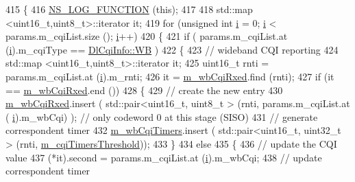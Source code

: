 \begin{DoxyCode}
415 \{
416   \hyperlink{log-macros-disabled_8h_a90b90d5bad1f39cb1b64923ea94c0761}{NS\_LOG\_FUNCTION} (\textcolor{keyword}{this});
417 
418   std::map <uint16\_t,uint8\_t>::iterator it;
419   \textcolor{keywordflow}{for} (\textcolor{keywordtype}{unsigned} \textcolor{keywordtype}{int} \hyperlink{bernuolliDistribution_8m_a6f6ccfcf58b31cb6412107d9d5281426}{i} = 0; \hyperlink{bernuolliDistribution_8m_a6f6ccfcf58b31cb6412107d9d5281426}{i} < params.m\_cqiList.size (); \hyperlink{bernuolliDistribution_8m_a6f6ccfcf58b31cb6412107d9d5281426}{i}++)
420     \{
421       \textcolor{keywordflow}{if} ( params.m\_cqiList.at (\hyperlink{bernuolliDistribution_8m_a6f6ccfcf58b31cb6412107d9d5281426}{i}).m\_cqiType == \hyperlink{structns3_1_1DlCqiInfo_a58a9fff4b49e4a8df1fdea1005c4735caa1097f844b06ac6dbdbac42802ba2403}{DlCqiInfo::WB} )
422         \{
423           \textcolor{comment}{// wideband CQI reporting}
424           std::map <uint16\_t,uint8\_t>::iterator it;
425           uint16\_t rnti = params.m\_cqiList.at (\hyperlink{bernuolliDistribution_8m_a6f6ccfcf58b31cb6412107d9d5281426}{i}).m\_rnti;
426           it = \hyperlink{classns3_1_1MmWaveFlexTtiMaxRateMacScheduler_adf66188149ac6a56b4a58f742a27187b}{m\_wbCqiRxed}.find (rnti);
427           \textcolor{keywordflow}{if} (it == \hyperlink{classns3_1_1MmWaveFlexTtiMaxRateMacScheduler_adf66188149ac6a56b4a58f742a27187b}{m\_wbCqiRxed}.end ())
428             \{
429               \textcolor{comment}{// create the new entry}
430               \hyperlink{classns3_1_1MmWaveFlexTtiMaxRateMacScheduler_adf66188149ac6a56b4a58f742a27187b}{m\_wbCqiRxed}.insert ( std::pair<uint16\_t, uint8\_t > (rnti, params.m\_cqiList.at (
      \hyperlink{bernuolliDistribution_8m_a6f6ccfcf58b31cb6412107d9d5281426}{i}).m\_wbCqi) ); \textcolor{comment}{// only codeword 0 at this stage (SISO)}
431               \textcolor{comment}{// generate correspondent timer}
432               \hyperlink{classns3_1_1MmWaveFlexTtiMaxRateMacScheduler_acabe6aa89f19153f8ce386a5fad72aed}{m\_wbCqiTimers}.insert ( std::pair<uint16\_t, uint32\_t > (rnti, 
      \hyperlink{classns3_1_1MmWaveFlexTtiMaxRateMacScheduler_a7f29b65f1e4a7c64cf73fe2efd02770f}{m\_cqiTimersThreshold}));
433             \}
434           \textcolor{keywordflow}{else}
435             \{
436               \textcolor{comment}{// update the CQI value}
437               (*it).second = params.m\_cqiList.at (\hyperlink{bernuolliDistribution_8m_a6f6ccfcf58b31cb6412107d9d5281426}{i}).m\_wbCqi;
438               \textcolor{comment}{// update correspondent timer}

\end{DoxyCode}

